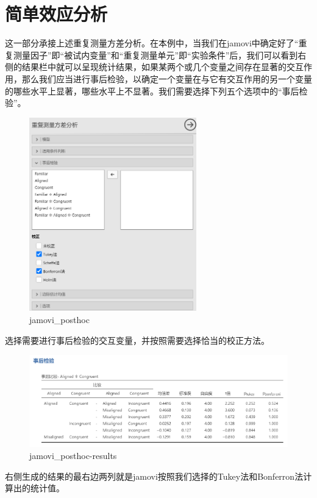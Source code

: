 \documentclass[
]{book}
\begin{document}
\section{简单效应分析}\label{ux7b80ux5355ux6548ux5e94ux5206ux6790}

这一部分承接上述重复测量方差分析。在本例中，当我们在jamovi中确定好了``重复测量因子''即``被试内变量''和``重复测量单元''即``实验条件''后，我们可以看到右侧的结果栏中就可以呈现统计结果，如果某两个或几个变量之间存在显著的交互作用，那么我们应当进行事后检验，以确定一个变量在与它有交互作用的另一个变量的哪些水平上显著，哪些水平上不显著。我们需要选择下列五个选项中的``事后检验''。

\begin{figure}
\centering
\includegraphics{img/jamovi/rmanova-posthoc.png}
\caption{jamovi\_posthoc}
\end{figure}

选择需要进行事后检验的交互变量，并按照需要选择恰当的校正方法。

\begin{figure}
\centering
\includegraphics{img/jamovi/rmanova-posthoc-results.png}
\caption{jamovi\_posthoc-results}
\end{figure}

右侧生成的结果的最右边两列就是jamovi按照我们选择的Tukey法和Bonferron法计算出的统计值。
\end{document}
